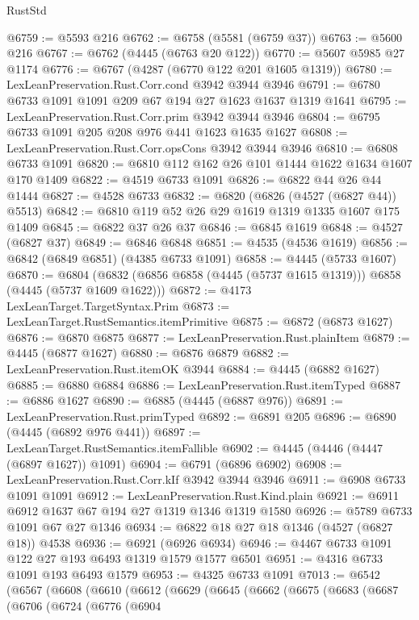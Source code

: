\begin{lexlean}{RustStd}
\begin{coremodule}
@6759 := @5593 @216
@6762 := @6758 (@5581 (@6759 @37))
@6763 := @5600 @216
@6767 := @6762 (@4445 (@6763 @20 @122))
@6770 := @5607 @5985 @27 @1174
@6776 := @6767 (@4287 (@6770 @122 @201 @1605 @1319))
@6780 := LexLeanPreservation.Rust.Corr.cond @3942 @3944 @3946
@6791 := @6780 @6733 @1091 @1091 @209 @67 @194 @27 @1623 @1637 @1319 @1641
@6795 := LexLeanPreservation.Rust.Corr.prim @3942 @3944 @3946
@6804 := @6795 @6733 @1091 @205 @208 @976 @441 @1623 @1635 @1627
@6808 := LexLeanPreservation.Rust.Corr.opsCons @3942 @3944 @3946
@6810 := @6808 @6733 @1091
@6820 := @6810 @112 @162 @26 @101 @1444 @1622 @1634 @1607 @170 @1409
@6822 := @4519 @6733 @1091
@6826 := @6822 @44 @26 @44 @1444
@6827 := @4528 @6733
@6832 := @6820 (@6826 (@4527 (@6827 @44)) @5513)
@6842 := @6810 @119 @52 @26 @29 @1619 @1319 @1335 @1607 @175 @1409
@6845 := @6822 @37 @26 @37
@6846 := @6845 @1619
@6848 := @4527 (@6827 @37)
@6849 := @6846 @6848
@6851 := @4535 (@4536 @1619)
@6856 := @6842 (@6849 @6851) (@4385 @6733 @1091)
@6858 := @4445 (@5733 @1607)
@6870 := @6804 (@6832 (@6856 @6858 (@4445 (@5737 @1615 @1319))) @6858 (@4445 (@5737 @1609 @1622)))
@6872 := @4173 LexLeanTarget.TargetSyntax.Prim
@6873 := LexLeanTarget.RustSemantics.itemPrimitive
@6875 := @6872 (@6873 @1627)
@6876 := @6870 @6875
@6877 := LexLeanPreservation.Rust.plainItem
@6879 := @4445 (@6877 @1627)
@6880 := @6876 @6879
@6882 := LexLeanPreservation.Rust.itemOK @3944
@6884 := @4445 (@6882 @1627)
@6885 := @6880 @6884
@6886 := LexLeanPreservation.Rust.itemTyped
@6887 := @6886 @1627
@6890 := @6885 (@4445 (@6887 @976))
@6891 := LexLeanPreservation.Rust.primTyped
@6892 := @6891 @205
@6896 := @6890 (@4445 (@6892 @976 @441))
@6897 := LexLeanTarget.RustSemantics.itemFallible
@6902 := @4445 (@4446 (@4447 (@6897 @1627)) @1091)
@6904 := @6791 (@6896 @6902)
@6908 := LexLeanPreservation.Rust.Corr.kIf @3942 @3944 @3946
@6911 := @6908 @6733 @1091 @1091
@6912 := LexLeanPreservation.Rust.Kind.plain
@6921 := @6911 @6912 @1637 @67 @194 @27 @1319 @1346 @1319 @1580
@6926 := @5789 @6733 @1091 @67 @27 @1346
@6934 := @6822 @18 @27 @18 @1346 (@4527 (@6827 @18)) @4538
@6936 := @6921 (@6926 @6934)
@6946 := @4467 @6733 @1091 @122 @27 @193 @6493 @1319 @1579 @1577 @6501
@6951 := @4316 @6733 @1091 @193 @6493 @1579
@6953 := @4325 @6733 @1091
@7013 := @6542
    (@6567
      (@6608
        (@6610
          (@6612
            (@6629
              (@6645
                (@6662
                  (@6675
                    (@6683
                      (@6687
                        (@6706
                          (@6724
                            (@6776
                              (@6904

\end{coremodule}
\end{lexlean}
